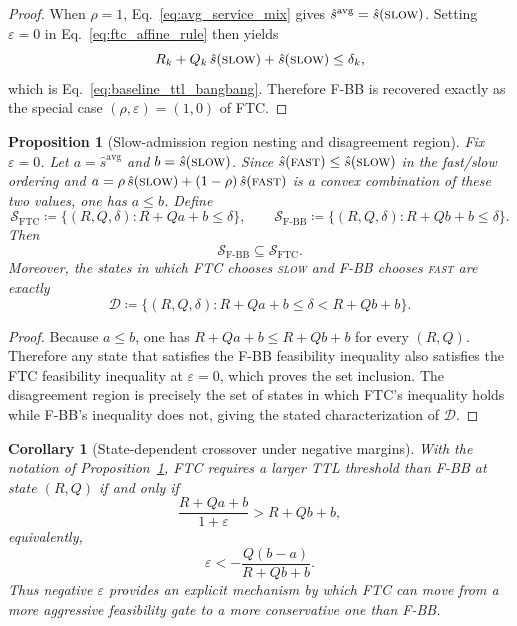 \documentclass[fleqn,12pt,lineno]{wlpeerj}
\newtheorem{proposition}[theorem]{Proposition}
\newtheorem{corollary}[theorem]{Corollary}
\begin{document}
\begin{proof}
When $\rho=1$, Eq.~\eqref{eq:avg_service_mix} gives $\hat{s}^{\mathrm{avg}}=\hat{s}(\textsc{slow})$. Setting $\varepsilon=0$ in Eq.~\eqref{eq:ftc_affine_rule} then yields
\[
R_k + Q_k\,\hat{s}(\textsc{slow}) + \hat{s}(\textsc{slow}) \le \delta_k,
\]
which is Eq.~\eqref{eq:baseline_ttl_bangbang}. Therefore F-BB is recovered exactly as the special case $(\rho,\varepsilon)=(1,0)$ of FTC.
\end{proof}

\begin{proposition}[Slow-admission region nesting and disagreement region]
\label{prop:region_nesting}
Fix $\varepsilon=0$. Let $a=\hat{s}^{\mathrm{avg}}$ and $b=\hat{s}(\textsc{slow})$. Since $\hat{s}(\textsc{fast})\le \hat{s}(\textsc{slow})$ in the fast/slow ordering and $a=\rho\,\hat{s}(\textsc{slow})+(1-\rho)\,\hat{s}(\textsc{fast})$ is a convex combination of these two values, one has $a\le b$. Define
\[
\mathcal S_{\mathrm{FTC}} \coloneqq \{(R,Q,\delta): R+Qa+b \le \delta\},
\qquad
\mathcal S_{\mathrm{F\mbox{-}BB}} \coloneqq \{(R,Q,\delta): R+Qb+b \le \delta\}.
\]
Then
\[
\mathcal S_{\mathrm{F\mbox{-}BB}} \subseteq \mathcal S_{\mathrm{FTC}}.
\]
Moreover, the states in which FTC chooses \textsc{slow} and F-BB chooses \textsc{fast} are exactly
\[
\mathcal D \coloneqq \{(R,Q,\delta): R+Qa+b \le \delta < R+Qb+b\}.
\]
\end{proposition}

\begin{proof}
Because $a\le b$, one has $R+Qa+b \le R+Qb+b$ for every $(R,Q)$. Therefore any state that satisfies the F-BB feasibility inequality also satisfies the FTC feasibility inequality at $\varepsilon=0$, which proves the set inclusion. The disagreement region is precisely the set of states in which FTC's inequality holds while F-BB's inequality does not, giving the stated characterization of $\mathcal D$.
\end{proof}

\begin{corollary}[State-dependent crossover under negative margins]
\label{cor:negative_margin_crossover}
With the notation of Proposition~\ref{prop:region_nesting}, FTC requires a larger TTL threshold than F-BB at state $(R,Q)$ if and only if
\[
\frac{R+Qa+b}{1+\varepsilon} > R+Qb+b,
\]
equivalently,
\[
\varepsilon < -\frac{Q(b-a)}{R+Qb+b}.
\]
Thus negative $\varepsilon$ provides an explicit mechanism by which FTC can move from a more aggressive feasibility gate to a more conservative one than F-BB.
\end{corollary}
\end{document}
